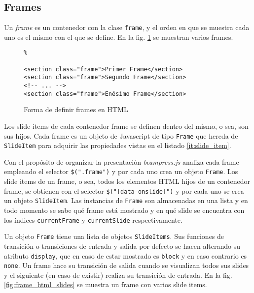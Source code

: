 
		\subsection{Frames} %
		 \label{sub:frames}
		 
		  
			Un \textit{frame} es un contenedor con la clase \texttt{frame}, y el orden en que se muestra cada uno es el mismo con el que se define. En la fig. \ref{fig:frames_html} se muestran varios frames.


				\begin{figure}[htb]%
					\begin{lstlisting}%

<section class="frame">Primer Frame</section>
<section class="frame">Segundo Frame</section>
<!-- ... -->
<section class="frame">Enésimo Frame</section>
					\end{lstlisting}
					\caption{Forma de definir frames en HTML}
					\label{fig:frames_html}
				\end{figure}

			Los slide items de cada contenedor frame se definen dentro del mismo, o sea, son sus hijos. Cada frame es un objeto de Javascript de tipo \texttt{Frame} que hereda de \texttt{SlideItem} para adquirir las propiedades vistas en el listado \ref{it:slide_item}. 

			Con el propósito de organizar la presentación \textit{beampress.js} analiza cada frame empleando el selector \texttt{\$(".frame")} y por cada uno crea un objeto \texttt{Frame}. Los slide items de un frame, o sea, todos los elementos HTML hijos de un contenedor frame, se obtienen con el selector \texttt{\$("[data-onslide]")} y por cada uno se crea un objeto \texttt{SlideItem}. Las instancias de \texttt{Frame} son almacenadas en una lista y en todo momento se sabe qué frame está mostrado y en qué slide se encuentra con los índices \texttt{currentFrame} y \texttt{currentSlide} respectivamente.

			Un objeto \texttt{Frame} tiene una lista de objetos \texttt{SlideItems}. Sus funciones de transición o transiciones de entrada y salida por defecto se hacen alterando su atributo \texttt{display}, que en caso de estar mostrado es \texttt{block} y en caso contrario es \texttt{none}. Un frame hace su transición de salida cuando se visualizan todos sus slides y el siguiente (en caso de existir) realiza su transición de entrada. En la fig. \ref{fig:frame_html_slides} se muestra un frame con varios slide items.

